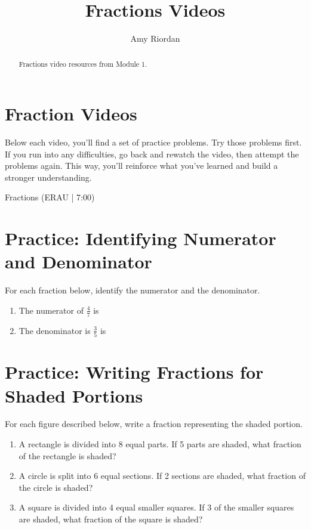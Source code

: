 \documentclass{ximera}
\title{Fractions Videos}
\author{Amy Riordan}
\begin{document}
\begin{abstract}
Fractions video resources from Module 1.
\end{abstract}
\maketitle

\section*{Fraction Videos}

Below each video, you’ll find a set of practice problems. Try those problems first. If you run into any difficulties, go back and rewatch the video, then attempt the problems again. This way, you’ll reinforce what you’ve learned and build a stronger understanding.

Fractions (ERAU | 7:00)



\section*{Practice: Identifying Numerator and Denominator}

For each fraction below, identify the numerator and the denominator.

\begin{problem}
\begin{enumerate}
\item The numerator of $\frac{4}{7}$ is 
 
\item The denominator is $\frac{3}{5}$ is 
 
\end{enumerate}
\end{problem}


\section*{Practice: Writing Fractions for Shaded Portions}

For each figure described below, write a fraction representing the shaded portion.

\begin{problem}
\begin{enumerate}
    \item A rectangle is divided into 8 equal parts. If 5 parts are shaded, what fraction of the rectangle is shaded?
    \item A circle is split into 6 equal sections. If 2 sections are shaded, what fraction of the circle is shaded?
    \item A square is divided into 4 equal smaller squares. If 3 of the smaller squares are shaded, what fraction of the square is shaded?
\end{enumerate}
\end{problem}
\end{document}
